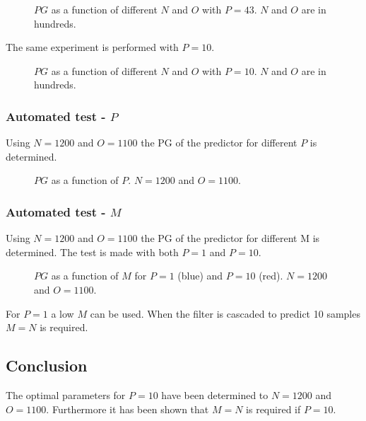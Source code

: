 \begin{figure}[H]
	\centering
	
	\caption{$PG$ as a function of different $N$ and $O$ with $P=43$. $N$ and $O$ are in hundreds.}
	\label{fig:Predict43App}
\end{figure}

The same experiment is performed with $P=10$.
\begin{figure}[H]
	\centering
	
	\caption{$PG$ as a function of different $N$ and $O$ with $P=10$. $N$ and $O$ are in hundreds.}
	\label{fig:Predict10App}
\end{figure}


\subsubsection{Automated test - $P$}
Using $N=1200$ and $O=1100$ the PG of the predictor for different $P$ is determined. 
\begin{figure}[H]
	\centering
	
	\caption{$PG$ as a function of $P$. $N=1200$ and $O=1100$.}
	\label{fig:PredictPApp}
\end{figure}

\subsubsection{Automated test - $M$}
Using $N=1200$ and $O=1100$ the PG of the predictor for different M is determined. The test is made with both $P=1$ and $P=10$. 
\begin{figure}[H]
	\centering
	
	\caption{$PG$ as a function of $M$ for $P=1$ (blue) and $P=10$ (red).  $N=1200$ and $O=1100$.}
	\label{fig:PredictMApp}
\end{figure}
For $P=1$ a low $M$ can be used. When the filter is cascaded to predict 10 samples $M=N$ is required. 

\subsection{Conclusion}
The optimal parameters for $P=10$ have been determined to $N=1200$ and $O=1100$. Furthermore it has been shown that $M=N$ is required if $P=10$. 
